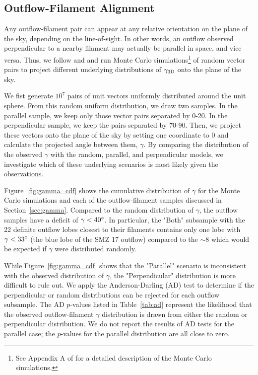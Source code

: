 \documentclass[twocolumn]{aastex63}
\begin{document}
\subsection{Outflow-Filament Alignment}
Any outflow-filament pair can appear at any relative orientation on the plane of the sky, depending on the line-of-sight. In other words, an outflow observed perpendicular to a nearby filament may actually be parallel in space, and vice versa. Thus, we follow \citet{Stephens17} and \citet{Kong19} and run Monte Carlo simulations\footnote{See Appendix A of \citet{Stephens17} for a detailed description of the Monte Carlo simulations.} of random vector pairs to project different underlying distributions of $\gamma_{\rm 3D}$ onto the plane of the sky.

We fist generate $10^7$ pairs of unit vectors uniformly distributed around the unit sphere. From this random uniform distribution, we draw two samples. In the parallel sample, we keep only those vector pairs separated by 0-20\degr. In the perpendicular sample, we keep the pairs separated by 70-90\degr. Then, we project these vectors onto the plane of the sky by setting one coordinate to 0 and calculate the projected angle between them, $\gamma$. By comparing the distribution of the observed $\gamma$ with the random, parallel, and perpendicular models, we investigate which of these underlying scenarios is most likely given the observations.

Figure~\ref{fig:gamma_cdf} shows the cumulative distribution of $\gamma$ for the Monte Carlo simulations and each of the outflow-filament samples discussed in Section~\ref{sec:gamma}. Compared to the random distribution of $\gamma$, the outflow samples have a deficit of $\gamma < 40\mbox{$^\circ$}$. In particular, the "Both" subsample with the 22 definite outflow lobes closest to their filaments contains only one lobe with $\gamma < 33\mbox{$^\circ$}$ (the blue lobe of the SMZ 17 outflow) compared to the $\sim8$ which would be expected if $\gamma$ were distributed randomly.

While Figure~\ref{fig:gamma_cdf} shows that the "Parallel" scenario is inconsistent with the observed distribution of $\gamma$, the "Perpendicular" distribution is more difficult to rule out. We apply the Anderson-Darling (AD) test \citep{Stephens74} to determine if the perpendicular or random distributions can be rejected for each outflow subsample. The AD $p$-values listed in Table~\ref{tab:ad} represent the likelihood that the observed outflow-filament $\gamma$ distribution is drawn from either the random or perpendicular distribution. We do not report the results of AD tests for the parallel case; the $p$-values for the parallel distribution are all close to zero.
\end{document}
